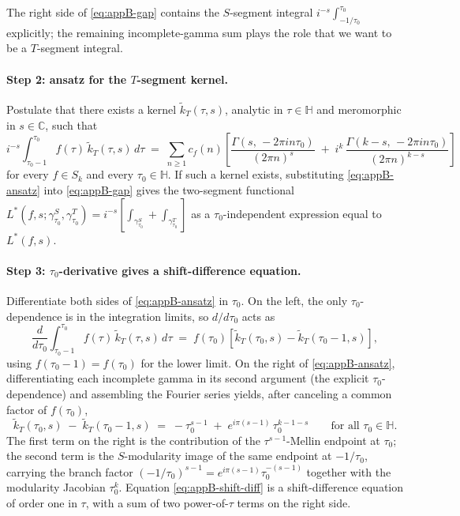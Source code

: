 \documentclass[11pt]{article}
\numberwithin{equation}{section}  %
\newcommand{\HH}{\mathbb{H}}
\newcommand{\CC}{\mathbb{C}}
\begin{document}
The right side of \eqref{eq:appB-gap} contains the $S$-segment integral
$i^{-s}\int_{-1/\tau_0}^{\tau_0}$ explicitly; the remaining
incomplete-gamma sum plays the role that we want to be a $T$-segment
integral.

\paragraph{Step 2: ansatz for the $T$-segment kernel.}
Postulate that there exists a kernel $\widetilde{k}_T(\tau, s)$,
analytic in $\tau \in \HH$ and meromorphic in $s \in \CC$, such that
\begin{equation}\label{eq:appB-ansatz}
  i^{-s}\!\int_{\tau_0-1}^{\tau_0}\! f(\tau)\,\widetilde{k}_T(\tau, s)\,d\tau
  \;=\; \sum_{n \ge 1} c_f(n)\!
  \left[\frac{\Gamma(s,\,-2\pi i n \tau_0)}{(2\pi n)^s}
  \;+\; i^k\,\frac{\Gamma(k - s,\,-2\pi i n \tau_0)}{(2\pi n)^{k - s}}\right]
\end{equation}
for every $f \in S_k$ and every $\tau_0 \in \HH$.  If such a kernel
exists, substituting \eqref{eq:appB-ansatz} into \eqref{eq:appB-gap}
gives the two-segment functional
$L^*(f, s; \gamma^S_{\tau_0}, \gamma^T_{\tau_0}) = i^{-s}[\int_{\gamma^S_{\tau_0}} +
\int_{\gamma^T_{\tau_0}}]$ as a $\tau_0$-independent expression equal to
$L^*(f, s)$.

\paragraph{Step 3: $\tau_0$-derivative gives a shift-difference equation.}
Differentiate both sides of \eqref{eq:appB-ansatz} in $\tau_0$.  On the
left, the only $\tau_0$-dependence is in the integration limits, so
$d/d\tau_0$ acts as
\begin{equation}
  \frac{d}{d\tau_0}\!\int_{\tau_0-1}^{\tau_0}\! f(\tau)\,\widetilde{k}_T(\tau, s)\,d\tau
  \;=\; f(\tau_0)\!\left[\widetilde{k}_T(\tau_0, s)
  - \widetilde{k}_T(\tau_0 - 1, s)\right],
\end{equation}
using $f(\tau_0 - 1) = f(\tau_0)$ for the lower limit.  On the right
of \eqref{eq:appB-ansatz}, differentiating each incomplete gamma in
its second argument (the explicit $\tau_0$-dependence) and assembling
the Fourier series yields, after canceling a common factor of
$f(\tau_0)$,
\begin{equation}\label{eq:appB-shift-diff}
  \widetilde{k}_T(\tau_0, s) \;-\; \widetilde{k}_T(\tau_0 - 1, s)
  \;=\; -\tau_0^{s-1} \;+\; e^{i\pi(s-1)}\,\tau_0^{k - 1 - s}
  \qquad \text{for all } \tau_0 \in \HH.
\end{equation}
The first term on the right is the contribution of the
$\tau^{s-1}$-Mellin endpoint at $\tau_0$; the second term is the
$S$-modularity image of the same endpoint at $-1/\tau_0$, carrying
the branch factor $(-1/\tau_0)^{s-1} = e^{i\pi(s-1)}\tau_0^{-(s-1)}$
together with the modularity Jacobian $\tau_0^k$.  Equation
\eqref{eq:appB-shift-diff} is a shift-difference equation of order
one in $\tau$, with a sum of two power-of-$\tau$ terms on the right
side.
\end{document}
